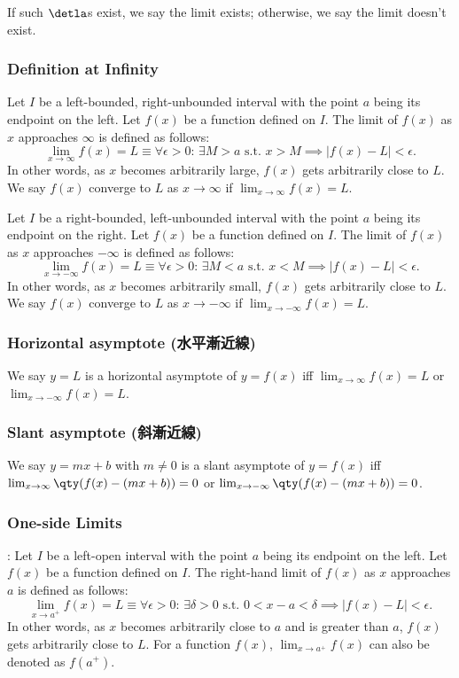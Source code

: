 \documentclass[a4paper,12pt]{report}
\begin{document}
If such $\detla$s exist, we say the limit exists; otherwise, we say the limit doesn't exist.
\subsubsection{Definition at Infinity}
Let \(I\) be a left-bounded, right-unbounded interval with the point \(a\) being its endpoint on the left. Let \( f(x) \) be a function defined on \(I\). The limit of \( f(x) \) as \( x \) approaches \( \infty \) is defined as follows:
\[\lim_{x \to \infty} f(x) = L \equiv \forall \epsilon > 0: \, \exists M > a \text{\ s.t.\ } x > M \implies |f(x) - L| < \epsilon.\]
In other words, as \(x\) becomes arbitrarily large, \(f(x)\) gets arbitrarily close to \(L\). We say $f(x)$ converge to $L$ as $x\to\infty$ if $\lim_{x \to \infty} f(x) = L$.

Let \(I\) be a right-bounded, left-unbounded interval with the point \(a\) being its endpoint on the right. Let \( f(x) \) be a function defined on \(I\). The limit of \( f(x) \) as \( x \) approaches \( -\infty \) is defined as follows:
\[\lim_{x \to -\infty} f(x) = L \equiv \forall \epsilon > 0: \, \exists M < a \text{\ s.t.\ } x < M \implies |f(x) - L| < \epsilon.\]
In other words, as \(x\) becomes arbitrarily small, \(f(x)\) gets arbitrarily close to \(L\). We say $f(x)$ converge to $L$ as $x\to-\infty$ if $\lim_{x \to -\infty} f(x) = L$.
\subsubsection{Horizontal asymptote (水平漸近線)}
We say $y=L$ is a horizontal asymptote of $y=f(x)$ iff $\lim_{x \to \infty} f(x)=L$ or $\lim_{x \to -\infty} f(x)=L$.
\subsubsection{Slant asymptote (斜漸近線)}
We say $y=mx+b$ with $m\neq 0$ is a slant asymptote of $y=f(x)$ iff $\lim_{x \to \infty} \qty(f(x)-(mx+b))=0$ or $\lim_{x \to -\infty} \qty(f(x)-(mx+b))=0$.
\subsubsection{One-side Limits}
: Let \(I\) be a left-open interval with the point \(a\) being its endpoint on the left. Let \( f(x) \) be a function defined on \(I\). The right-hand limit of \( f(x) \) as \( x \) approaches \( a \) is defined as follows:
\[\lim_{x \to a^+} f(x) = L \equiv \forall \epsilon > 0 :\,\exists \delta > 0 \text{\ s.t.\ } 0 < x - a < \delta \implies |f(x) - L| < \epsilon.\]
In other words, as \(x\) becomes arbitrarily close to \(a\) and is greater than \(a\), \(f(x)\) gets arbitrarily close to \(L\). For a function $f(x)$, $\lim_{x\to a^+}f(x)$ can also be denoted as $f(a^+)$.
\end{document}
